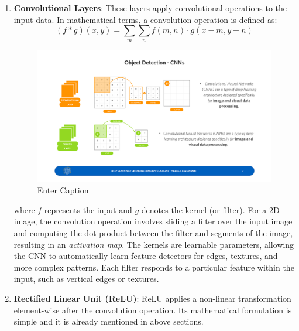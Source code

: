 \begin{enumerate}
    \item \textbf{Convolutional Layers}: These layers apply convolutional operations to the input data. In mathematical terms, a convolution operation is defined as:
    \begin{equation}
        (f * g)(x, y) = \sum_{m}\sum_{n}f(m, n) \cdot g(x - m, y - n)
    \end{equation}
    \begin{figure}[H]
        \centering
        \includegraphics[width=1\linewidth]{LateX//figs/CCN_layer.pdf}
        \caption{Enter Caption}
        \label{fig:enter-label}
    \end{figure}
    where \( f \) represents the input and \( g \) denotes the kernel (or filter). For a 2D image, the convolution operation involves sliding a filter over the input image and computing the dot product between the filter and segments of the image, resulting in an \textit{activation map}. The kernels are learnable parameters, allowing the CNN to automatically learn feature detectors for edges, textures, and more complex patterns. Each filter responds to a particular feature within the input, such as vertical edges or textures.

    \item \textbf{Rectified Linear Unit (ReLU)}: ReLU applies a non-linear transformation element-wise after the convolution operation. Its mathematical formulation is simple and it is already mentioned in above sections.


\end{enumerate}

